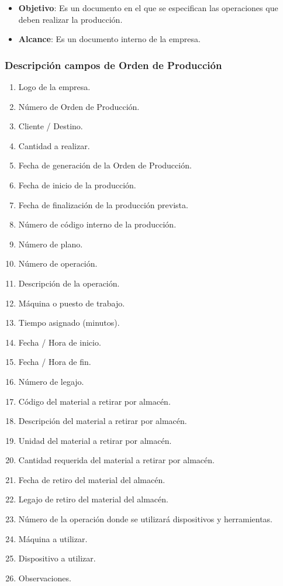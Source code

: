 \pagebreak
\begin{itemize}
 \item \textbf{Objetivo}: Es un documento en el que se especifican las operaciones que deben realizar la producci\'on.
 \item \textbf{Alcance}: Es un documento interno de la empresa.
\end{itemize}

\subsubsection{Descripción campos de Orden de Producci\'on}
\begin{enumerate}
 \item Logo de la empresa.
 \item Número de Orden de Producci\'on.
 \item Cliente / Destino.
 \item Cantidad a realizar.
 \item Fecha de generaci\'on de la Orden de Producci\'on.
 \item Fecha de inicio de la producción.
 \item Fecha de finalización de la producción prevista.
 \item N\'umero de código interno de la producci\'on.
 \item N\'umero de plano.
 \item N\'umero de operaci\'on.
 \item Descripci\'on de la operaci\'on.
 \item M\'aquina o puesto de trabajo.
 \item Tiempo asignado (minutos).
 \item Fecha / Hora de inicio.
 \item Fecha / Hora de fin.
 \item N\'umero de legajo.
 \item C\'odigo del material a retirar por almac\'en.
 \item Descripci\'on del material a retirar por almac\'en.
 \item Unidad del material a retirar por almac\'en.
 \item Cantidad requerida del material a retirar por almac\'en.
 \item Fecha de retiro del material del almac\'en.
 \item Legajo de retiro del material del almac\'en.
 \item N\'umero de la operaci\'on donde se utilizar\'a dispositivos y herramientas.
 \item M\'aquina a utilizar.
 \item Dispositivo a utilizar.
 \item Observaciones.
\end{enumerate}

